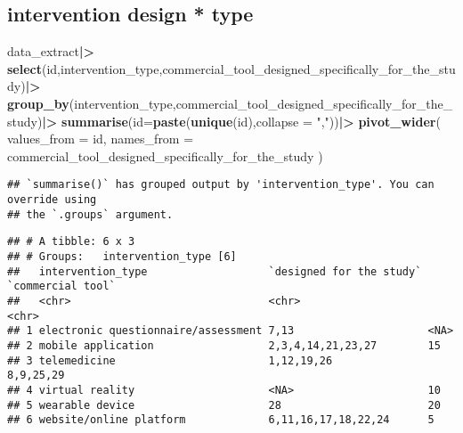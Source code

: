 \documentclass[
]{article}
\newenvironment{Shaded}{\begin{snugshade}}{\end{snugshade}}
\newcommand{\AttributeTok}[1]{\textcolor[rgb]{0.13,0.29,0.53}{#1}}
\newcommand{\FunctionTok}[1]{\textcolor[rgb]{0.13,0.29,0.53}{\textbf{#1}}}
\newcommand{\NormalTok}[1]{#1}
\newcommand{\SpecialCharTok}[1]{\textcolor[rgb]{0.81,0.36,0.00}{\textbf{#1}}}
\newcommand{\StringTok}[1]{\textcolor[rgb]{0.31,0.60,0.02}{#1}}
\begin{document}
\subsection{intervention design * type}\label{intervention-design-type}

\begin{Shaded}
\begin{Highlighting}[]
\NormalTok{data\_extract}\SpecialCharTok{|\textgreater{}}
  \FunctionTok{select}\NormalTok{(id,intervention\_type,commercial\_tool\_designed\_specifically\_for\_the\_study)}\SpecialCharTok{|\textgreater{}}
  \FunctionTok{group\_by}\NormalTok{(intervention\_type,commercial\_tool\_designed\_specifically\_for\_the\_study)}\SpecialCharTok{|\textgreater{}}
  \FunctionTok{summarise}\NormalTok{(}\AttributeTok{id=}\FunctionTok{paste}\NormalTok{(}\FunctionTok{unique}\NormalTok{(id),}\AttributeTok{collapse =} \StringTok{","}\NormalTok{))}\SpecialCharTok{|\textgreater{}}
  \FunctionTok{pivot\_wider}\NormalTok{(}
    \AttributeTok{values\_from =}\NormalTok{ id,}
    \AttributeTok{names\_from =}\NormalTok{ commercial\_tool\_designed\_specifically\_for\_the\_study}
\NormalTok{  )}
\end{Highlighting}
\end{Shaded}

\begin{verbatim}
## `summarise()` has grouped output by 'intervention_type'. You can override using
## the `.groups` argument.
\end{verbatim}

\begin{verbatim}
## # A tibble: 6 x 3
## # Groups:   intervention_type [6]
##   intervention_type                   `designed for the study` `commercial tool`
##   <chr>                               <chr>                    <chr>            
## 1 electronic questionnaire/assessment 7,13                     <NA>             
## 2 mobile application                  2,3,4,14,21,23,27        15               
## 3 telemedicine                        1,12,19,26               8,9,25,29        
## 4 virtual reality                     <NA>                     10               
## 5 wearable device                     28                       20               
## 6 website/online platform             6,11,16,17,18,22,24      5
\end{verbatim}
\end{document}
